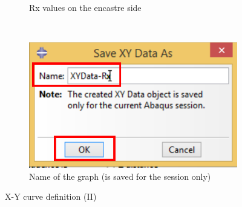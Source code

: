 \begin{enumerate}
\begin{figure}[H]
\begin{varwidth}{0.55\linewidth}
\begin{subfigure}{0.99\textwidth}
      \caption{Rx values on the encastre side}
      \label{figu108}
    \end{subfigure}
    \\
    \begin{subfigure}{0.75\textwidth}
      \includegraphics[width=\textwidth]{./body/images/imagen109.pdf}
      \caption{Name of the graph (is saved for the session only)}
      \label{figu109}
    \end{subfigure}
  \end{varwidth}
  \caption{X-Y curve definition (II)}
\end{figure}



\end{enumerate}
